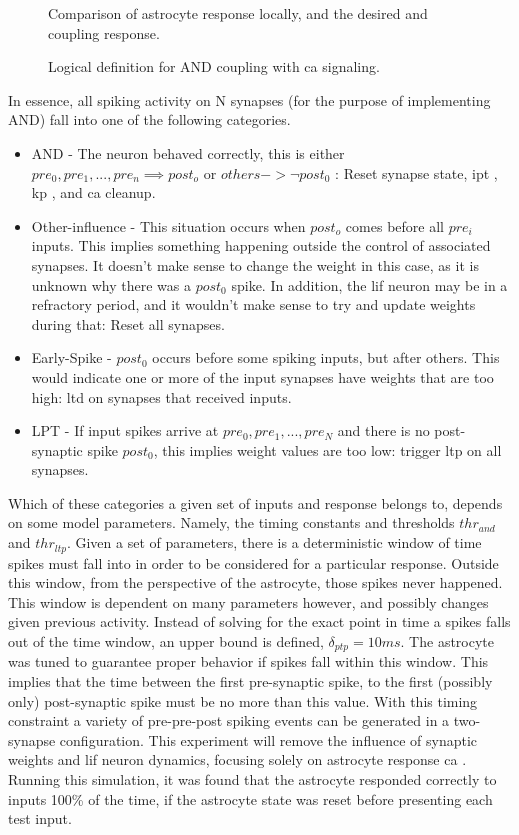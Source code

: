 \documentclass[conference]{IEEEtran}
\newcommand{\ca}{\gls{ca}\textrm{ }}
\newcommand{\ipt}{\gls{ipt}\textrm{ }}
\newcommand{\kp}{\gls{kp}\textrm{ }}
\newcommand{\asvgf}[4]{
	\begin{figure}[htbp]
    	\centering
		\adjustbox{max width=#4\linewidth}{}
        \caption{#2.}
        \label{#3}
	\end{figure}
}
\begin{document}
\asvgf{figures/AstroAndCoupling_implementation.svg}{Comparison of astrocyte
  response locally, and the desired and coupling
  response}{fig:global-v-local-and-coupling}{1.0}

\asvgf{figures/AstroAndCoupling_signals.svg}{Logical definition for AND
  coupling with \ca signaling}{fig:local-ca-global-response}{1.0}

In essence, all spiking activity on N synapses (for the purpose of implementing
AND) fall into one of the following categories.
\begin{itemize}
\item AND - The neuron behaved correctly, this is either $pre_0, pre_1, ...,
  pre_n \implies post_o$ or $others -> \neg post_0$ : Reset synapse state, \ipt,
  \kp, and \ca cleanup.
\item Other-influence - This situation occurs when $post_o$ comes before all
  $pre_i$ inputs. This implies something happening outside the control of
  associated synapses. It doesn't make sense to change the weight in this case,
  as it is unknown why there was a $post_0$ spike. In addition, the \gls{lif} neuron
  may be in a refractory period, and it wouldn't make sense to try and update
  weights during that: Reset all synapses.
\item Early-Spike - $post_0$ occurs before some spiking inputs, but after
  others. This would indicate one or more of the input synapses have weights
  that are too high: \gls{ltd} on synapses that received inputs.
\item LPT - If input spikes arrive at $pre_0, pre_1, ..., pre_N$ and there is no
  post-synaptic spike $post_0$, this implies weight values are too low: trigger
  \gls{ltp} on all synapses.
\end{itemize}

Which of these categories a given set
of inputs and response belongs to, depends on some model parameters. Namely,
the timing constants and thresholds $thr_{and}$ and $thr_{ltp}$. Given a
set of parameters, there is a deterministic window of time spikes must fall into
in order to be considered for a particular response. Outside this window, from
the perspective of the astrocyte, those spikes never happened. This window is
dependent on many parameters however, and possibly changes given previous
activity. Instead of solving for the exact point in time a spikes falls out of
the time window, an upper bound is defined, $\delta_{ptp}=10ms$. The astrocyte
was tuned to guarantee proper behavior if spikes fall within this
window. This implies that the time between the first pre-synaptic spike, to the
first (possibly only) post-synaptic spike must be no more than this value. With
this timing constraint a variety of pre-pre-post spiking events can be generated
in a two-synapse configuration. This experiment will remove the influence of
synaptic weights and \gls{lif} neuron dynamics, focusing solely on astrocyte
response \ca. Running this simulation, it was found that the astrocyte responded
correctly to inputs 100\% of the time, if the astrocyte state was reset before
presenting each test input.
\end{document}
